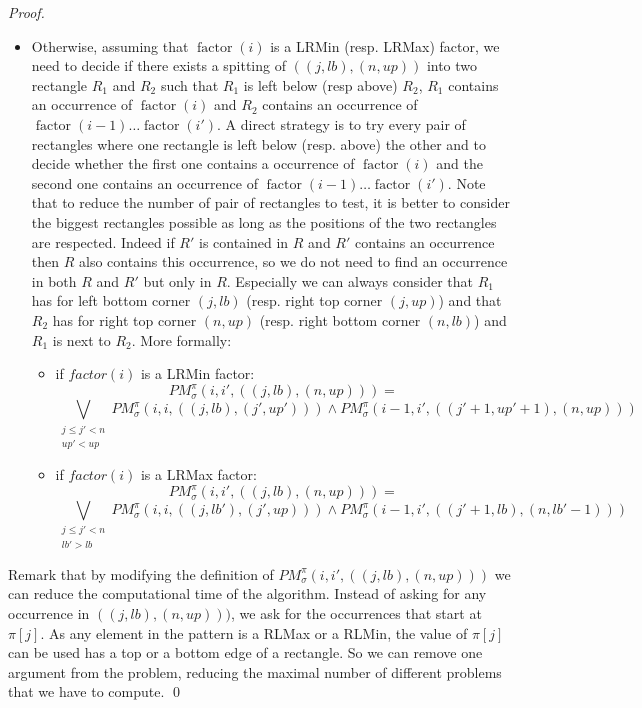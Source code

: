 \documentclass[a4paper]{llncs}
\newcounter{num}
\newcommand{\PM}{PM}
\DeclareMathOperator{\factor}{factor}
\begin{document}
\begin{proof}
\begin{itemize}
\item Otherwise, assuming that $\factor(i)$ is a LRMin (resp. LRMax) factor,
we need to decide if there exists a spitting of $((j,lb),(n,up))$  into two rectangle $R_1$ and $R_2$ such that
$R_1$ is left below (resp above) $R_2$,
 $R_1$ contains an occurrence of $\factor(i)$
and  $R_2$ contains an occurrence of
$\factor(i-1)\ldots \factor(i')$.
A direct strategy is to try every pair of rectangles where one rectangle is left below (resp. above) the other
and to decide whether the first one contains a occurrence of $\factor(i)$
and the second one contains an occurrence of
$\factor(i-1)\ldots \factor(i')$.
Note that to reduce the number of pair of rectangles to test,
it is better to consider the biggest rectangles possible
as long as the positions of the two rectangles are respected.
Indeed if $R'$ is contained in $R$ and $R'$ contains an occurrence then
$R$ also contains this occurrence,
so we do not
need to find an occurrence in both $R$ and $R'$
but only in $R$.
Especially we can always consider that $R_1$ has for
left bottom corner $(j,lb)$ (resp. right top corner  $(j,up)$)
and that $R_2$ has for right top corner $(n,up)$
(resp. right bottom corner $(n,lb)$)
and $R_1$ is next to $R_2$.
More formally:
\begin{itemize}
\item if $factor(i)$ is a LRMin factor:
$$
\PM^\pi_\sigma(i,i',((j,lb),(n,up))) =
$$
$$
\bigvee_{
\substack{
j\leq j'<n\\ up' < up
}	} \PM^\pi_\sigma(i,i,((j,lb),(j',up'))) \wedge
\PM^\pi_\sigma(i-1,i',((j'+1,up'+1),(n,up)))
$$



\item if $factor(i)$ is a LRMax factor:
$$
\PM^\pi_\sigma(i,i',((j,lb),(n,up))) =
$$
$$
\bigvee_{\substack{
j\leq j'<n \\ lb'>lb
	}	} \PM^\pi_\sigma(i,i,((j,lb'),(j',up))) \wedge
\PM^\pi_\sigma(i-1,i',((j'+1,lb),(n,lb'-1)))
$$
\end{itemize}
\end{itemize}

Remark that by modifying the definition of $\PM^\pi_\sigma(i,i',((j,lb),(n,up)))$
we can reduce the computational time of the algorithm.
Instead of asking for any occurrence in $((j,lb),(n,up)))$,
we ask for the occurrences that start at $\pi[j]$.
As any element in the pattern is a RLMax or a RLMin,
the value of $\pi[j]$ can be used has a top or a bottom edge
of a rectangle.
So we can remove one argument from the problem,
reducing the maximal number of different problems that we have to compute.
\qed
\end{proof}
\end{document}
